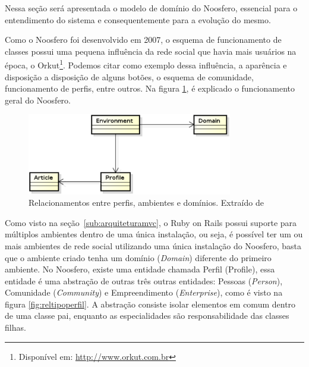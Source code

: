 Nessa seção será apresentada o modelo de domínio do Noosfero, essencial para o entendimento do sistema e consequentemente para a evolução do mesmo.

Como o Noosfero foi desenvolvido em 2007, o esquema de funcionamento de classes possui uma pequena influência da rede social que havia mais usuários na época, o Orkut\footnote{Disponível em: \url{http://www.orkut.com.br}}. Podemos citar como exemplo dessa influência, a aparência e disposição a disposição de alguns botões, o esquema de comunidade, funcionamento de perfis, entre outros. Na figura \ref{fig:relperfisambientes}, é explicado o funcionamento geral do Noosfero.

\graphicspath{{figuras/}}
\begin{figure}[H]
	\centering
	\includegraphics[width=0.8\textwidth]{dominio-ambiente}
	\caption[Relacionamentos entre perfis, ambientes e domínios]{Relacionamentos entre perfis, ambientes e domínios. Extraído de \cite{bucher2013rede}}
	\label{fig:relperfisambientes}
\end{figure}

Como visto na seção~\ref{sub:arquiteturamvc}, o Ruby on Rails possui suporte para múltiplos ambientes dentro de uma única instalação, ou seja, é possível ter um ou mais ambientes de rede social utilizando uma única instalação do Noosfero, basta que o ambiente criado tenha um domínio (\textit{Domain}) diferente do primeiro ambiente. No Noosfero, existe uma entidade chamada Perfil (Profile), essa entidade é uma abstração de outras três outras entidades: Pessoas (\textit{Person}), Comunidade (\textit{Community}) e Empreendimento (\textit{Enterprise}), como é visto na figura \ref{fig:reltipoperfil}. A abstração consiste isolar elementos em comum dentro de uma classe pai, enquanto as especialidades são responsabilidade das classes filhas.

